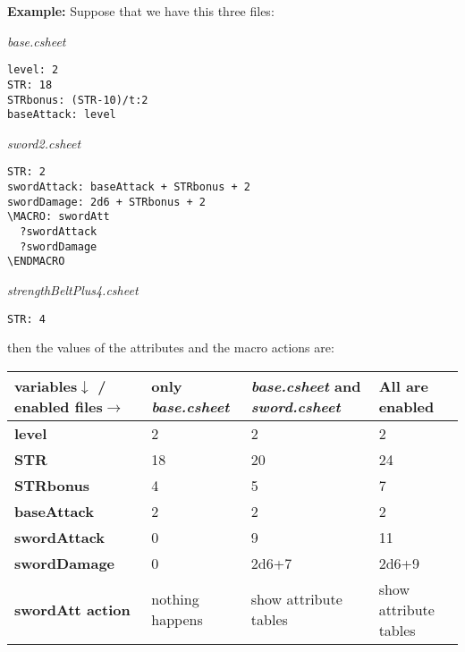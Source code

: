 \documentclass[11pt,a4paper,openright,oneside]{book}
\newenvironment{ex}
{
  \setlength{\parindent}{0cm}
  \large \textbf{Example:} \normalsize 
}
{}
\begin{document}
\begin{ex} Suppose that we have this three files: 

\hrulefill

\begin{center}\textit{base.csheet} \end{center}
  \begin{lstlisting}
level: 2
STR: 18
STRbonus: (STR-10)/t:2
baseAttack: level
  \end{lstlisting}  

\hrulefill

\begin{center} \textit{sword2.csheet} \end{center}
  \begin{lstlisting}
STR: 2
swordAttack: baseAttack + STRbonus + 2
swordDamage: 2d6 + STRbonus + 2
\MACRO: swordAtt
  ?swordAttack
  ?swordDamage
\ENDMACRO
  \end{lstlisting}  

\hrulefill

\begin{center} \textit{strengthBeltPlus4.csheet} \end{center}
  \begin{lstlisting}
STR: 4
  \end{lstlisting}  

\hrulefill

then the values of the attributes and the macro actions are:
\begin{table}[!ht]
\scriptsize
\begin{tabular}{|l|l|l|l|}
\hline
 variables$\downarrow$ / enabled files$\rightarrow$ & \textbf{ only \textit{base.csheet}} & \textbf{ \textit{base.csheet} and \textit{sword.csheet}} & \textbf{ All are enabled }\\ \hline
 \textbf{level          } & 2  & 2  & 2  \\ \hline
 \textbf{STR            } & 18 & 20 & 24  \\ \hline
 \textbf{STRbonus       } & 4  & 5  & 7  \\ \hline
 \textbf{baseAttack     } & 2  & 2  & 2 \\ \hline
 \textbf{swordAttack    } & 0  & 9  & 11 \\ \hline
 \textbf{swordDamage    } & 0  & 2d6+7 & 2d6+9 \\ \hline
 \textbf{swordAtt action} & nothing happens & show attribute tables  & show attribute tables  \\ \hline
\end{tabular}
\end{table}
\end{ex}
\end{document}
